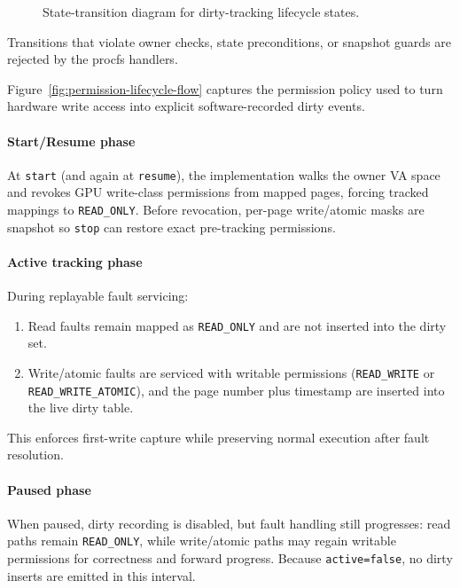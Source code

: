 \begin{figure}[H]
{
}
\caption{State-transition diagram for dirty-tracking lifecycle states.}
\label{fig:dirty-tracking-state-machine}
\end{figure}

Transitions that violate owner checks, state preconditions, or snapshot guards
are rejected by the procfs handlers.

Figure~\ref{fig:permission-lifecycle-flow} captures the permission policy used
to turn hardware write access into explicit software-recorded dirty events.

\paragraph{Start/Resume phase}
At \texttt{start} (and again at \texttt{resume}), the implementation walks the
owner VA space and revokes GPU write-class permissions from mapped pages,
forcing tracked mappings to \texttt{READ\_ONLY}. Before revocation, per-page
write/atomic masks are snapshot so \texttt{stop} can restore exact
pre-tracking permissions.

\paragraph{Active tracking phase}
During replayable fault servicing:
\begin{enumerate}
    \item Read faults remain mapped as \texttt{READ\_ONLY} and are not inserted
          into the dirty set.
    \item Write/atomic faults are serviced with writable permissions
          (\texttt{READ\_WRITE} or \texttt{READ\_WRITE\_ATOMIC}), and the page
          number plus timestamp are inserted into the live dirty table.
\end{enumerate}
This enforces first-write capture while preserving normal execution after fault
resolution.

\paragraph{Paused phase}
When paused, dirty recording is disabled, but fault handling still progresses:
read paths remain \texttt{READ\_ONLY}, while write/atomic paths may regain
writable permissions for correctness and forward progress. Because
\texttt{active=false}, no dirty inserts are emitted in this interval.

